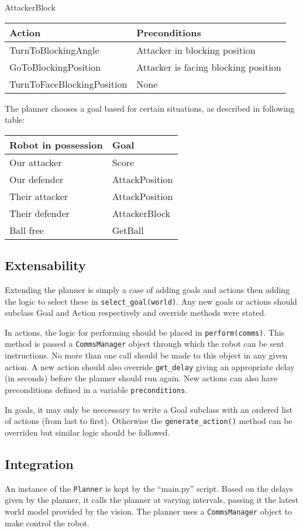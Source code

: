 \documentclass{article}
\begin{document}
AttackerBlock

\begin{tabular}{ | l | l | }
\hline
Action & Preconditions \\ \hline
TurnToBlockingAngle & Attacker in blocking position \\ \hline
GoToBlockingPosition & Attacker is facing blocking position \\ \hline
TurnToFaceBlockingPosition & None \\
\hline
\end{tabular}

The planner chooses a goal based for certain situations, as described in following table:

\begin{tabular}{ | l | l | }
\hline
Robot in possession & Goal \\ \hline
Our attacker & Score \\
Our defender & AttackPosition \\
Their attacker & AttackPosition \\
Their defender & AttackerBlock \\
Ball free & GetBall \\
\hline
\end{tabular}


\subsection{Extensability}

Extending the planner is simply a case of adding goals and actions then adding the logic to select these in \lstinline{select_goal(world)}. Any new goals or actions should subclass Goal and Action respectively and override methods were stated.

In actions, the logic for performing should be placed in \lstinline{perform(comms)}. This method is passed a \lstinline{CommsManager} object through which the robot can be sent instructions. No more than one call should be made to this object in any given action. A new action should also override \lstinline{get_delay} giving an appropriate delay (in seconds) before the planner should run again. New actions can also have preconditions defined in a variable \lstinline{preconditions}.

In goals, it may only be neccessary to write a Goal subclass with an ordered list of actions (from last to first). Otherwise the \lstinline{generate_action()} method can be overriden but similar logic should be followed.

\subsection{Integration}

An instance of the \lstinline{Planner} is kept by the ``main.py'' script. Based on the delays given by the planner, it calls the planner at varying intervals, passing it the latest world model provided by the vision. The planner uses a \lstinline{CommsManager} object to make control the robot.
\end{document}
